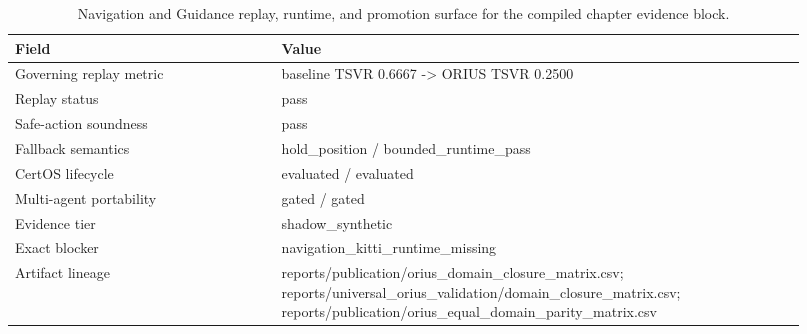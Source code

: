 \begin{table}[htbp]
\centering
\small
\caption{Navigation and Guidance replay, runtime, and promotion surface for the compiled chapter evidence block.}
\label{tab:navigation-replay-surface}
\begin{tabular}{p{0.31\linewidth}p{0.61\linewidth}}
\toprule
\textbf{Field} & \textbf{Value}\\
\midrule
Governing replay metric & baseline TSVR 0.6667 -> ORIUS TSVR 0.2500\\
Replay status & pass\\
Safe-action soundness & pass\\
Fallback semantics & hold\_position / bounded\_runtime\_pass\\
CertOS lifecycle & evaluated / evaluated\\
Multi-agent portability & gated / gated\\
Evidence tier & shadow\_synthetic\\
Exact blocker & navigation\_kitti\_runtime\_missing\\
Artifact lineage & reports/publication/orius\_domain\_closure\_matrix.csv; reports/universal\_orius\_validation/domain\_closure\_matrix.csv; reports/publication/orius\_equal\_domain\_parity\_matrix.csv\\
\bottomrule
\end{tabular}
\end{table}

